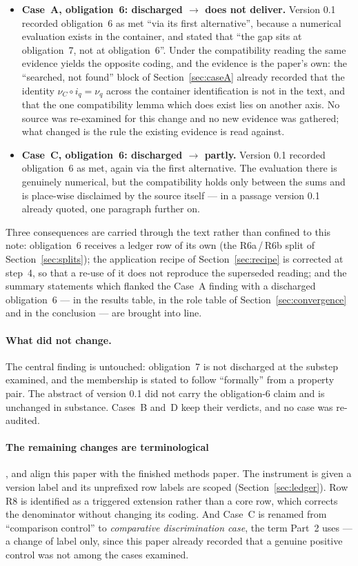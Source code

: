 \documentclass[11pt,a4paper]{article}
\theoremstyle{definition}
\begin{document}
\begin{itemize}
\item \textbf{Case~A, obligation~6: discharged $\rightarrow$ does not deliver.}
  Version 0.1 recorded obligation~6 as met ``via its first alternative'',
  because a numerical evaluation exists in the container, and stated that ``the
  gap sits at obligation~7, not at obligation~6''. Under the compatibility
  reading the same evidence yields the opposite coding, and the evidence is the
  paper's own: the ``searched, not found'' block of
  Section~\ref{sec:caseA} already recorded that the identity
  $\nu_C \circ i_q = \nu_q$ across the container identification is not in the
  text, and that the one compatibility lemma which does exist lies on another
  axis. No source was re-examined for this change and no new evidence was
  gathered; what changed is the rule the existing evidence is read against.
\item \textbf{Case~C, obligation~6: discharged $\rightarrow$ partly.} Version
  0.1 recorded obligation~6 as met, again via the first alternative. The
  evaluation there is genuinely numerical, but the compatibility holds only
  between the sums and is place-wise disclaimed by the source itself --- in a
  passage version 0.1 already quoted, one paragraph further on.
\end{itemize}

Three consequences are carried through the text rather than confined to this
note: obligation~6 receives a ledger row of its own (the R6a\,/\,R6b split of
Section~\ref{sec:splits}); the application recipe of Section~\ref{sec:recipe} is
corrected at step~4, so that a re-use of it does not reproduce the superseded
reading; and the summary statements which flanked the Case~A finding with a
discharged obligation~6 --- in the results table, in the role table of
Section~\ref{sec:convergence} and in the conclusion --- are brought into line.

\paragraph{What did not change.} The central finding is untouched: obligation~7
is not discharged at the substep examined, and the membership is stated to
follow ``formally'' from a property pair. The abstract of version 0.1 did not
carry the obligation-6 claim and is unchanged in substance. Cases~B and~D keep
their verdicts, and no case was re-audited.

\paragraph{The remaining changes are terminological}, and align this paper with
the finished methods paper. The instrument is given a version label and its
unprefixed row labels are scoped (Section~\ref{sec:ledger}). Row R8 is
identified as a triggered extension rather than a core row, which corrects the
denominator without changing its coding. And Case~C is renamed from ``comparison
control'' to \emph{comparative discrimination case}, the term Part~2 uses --- a
change of label only, since this paper already recorded that a genuine positive
control was not among the cases examined.
\end{document}
